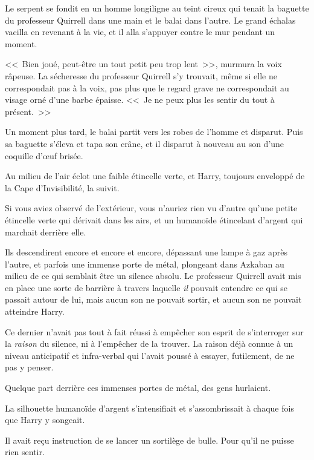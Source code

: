 Le serpent se fondit en un homme longiligne au teint cireux qui tenait la baguette du professeur Quirrell dans une main et le balai dans l'autre. Le grand échalas vacilla en revenant à la vie, et il alla s'appuyer contre le mur pendant un moment.

<<~Bien joué, peut-être un tout petit peu trop lent~>>, murmura la voix râpeuse. La sécheresse du professeur Quirrell s'y trouvait, même si elle ne correspondait pas à la voix, pas plus que le regard grave ne correspondait au visage orné d'une barbe épaisse. <<~Je ne peux plus les sentir du tout à présent.~>>

Un moment plus tard, le balai partit vers les robes de l'homme et disparut. Puis sa baguette s'éleva et tapa son crâne, et il disparut à nouveau au son d'une coquille d'œuf brisée.

Au milieu de l'air éclot une faible étincelle verte, et Harry, toujours enveloppé de la Cape d'Invisibilité, la suivit.

Si vous aviez observé de l'extérieur, vous n'auriez rien vu d'autre qu'une petite étincelle verte qui dérivait dans les airs, et un humanoïde étincelant d'argent qui marchait derrière elle.

\later

Ils descendirent encore et encore et encore, dépassant une lampe à gaz après l'autre, et parfois une immense porte de métal, plongeant dans Azkaban au milieu de ce qui semblait être un silence absolu. Le professeur Quirrell avait mis en place une sorte de barrière à travers laquelle \emph{il} pouvait entendre ce qui se passait autour de lui, mais aucun son ne pouvait sortir, et aucun son ne pouvait atteindre Harry.

Ce dernier n'avait pas tout à fait réussi à empêcher son esprit de s'interroger sur la \emph{raison} du silence, ni à l'empêcher de la trouver. La raison déjà connue à un niveau anticipatif et infra-verbal qui l'avait poussé à essayer, futilement, de ne pas y penser.

Quelque part derrière ces immenses portes de métal, des gens hurlaient.

La silhouette humanoïde d'argent s'intensifiait et s'assombrissait à chaque fois que Harry y songeait.

Il avait reçu instruction de se lancer un sortilège de bulle. Pour qu'il ne puisse rien sentir.

